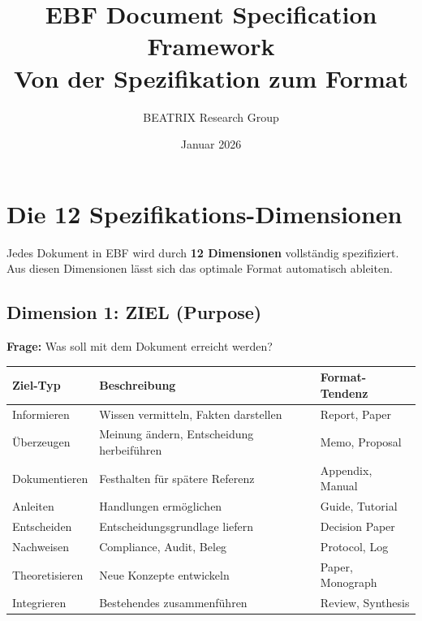 \documentclass[12pt,a4paper]{article}
\title{EBF Document Specification Framework\\
\large Von der Spezifikation zum Format}
\author{BEATRIX Research Group}
\date{Januar 2026}
\begin{document}
\maketitle
\tableofcontents
\newpage

\section{Die 12 Spezifikations-Dimensionen}

\begin{tcolorbox}[colback=blue!5!white, colframe=blue!75!black, 
    title=Dokumenten-DNA: Vollständige Spezifikation]

Jedes Dokument in EBF wird durch \textbf{12 Dimensionen} vollständig spezifiziert.
Aus diesen Dimensionen lässt sich das optimale Format automatisch ableiten.

\end{tcolorbox}

\subsection{Dimension 1: ZIEL (Purpose)}

\textbf{Frage:} Was soll mit dem Dokument erreicht werden?

\begin{table}[htbp]
\centering
\renewcommand{\arraystretch}{1.3}
\begin{tabular}{@{}lp{8cm}l@{}}
\toprule
\textbf{Ziel-Typ} & \textbf{Beschreibung} & \textbf{Format-Tendenz} \\
\midrule
Informieren & Wissen vermitteln, Fakten darstellen & Report, Paper \\
Überzeugen & Meinung ändern, Entscheidung herbeiführen & Memo, Proposal \\
Dokumentieren & Festhalten für spätere Referenz & Appendix, Manual \\
Anleiten & Handlungen ermöglichen & Guide, Tutorial \\
Entscheiden & Entscheidungsgrundlage liefern & Decision Paper \\
Nachweisen & Compliance, Audit, Beleg & Protocol, Log \\
Theoretisieren & Neue Konzepte entwickeln & Paper, Monograph \\
Integrieren & Bestehendes zusammenführen & Review, Synthesis \\
\bottomrule
\end{tabular}
\end{table}
\end{document}
